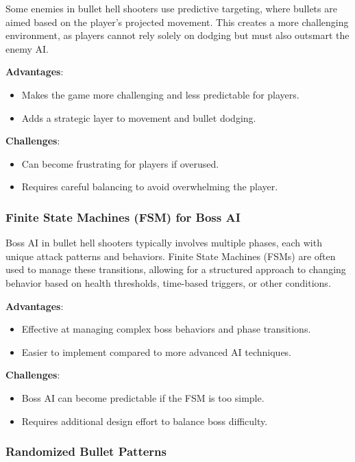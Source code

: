 Some enemies in bullet hell shooters use predictive targeting, where bullets are aimed based on the player's projected movement. This creates a more challenging environment, as players cannot rely solely on dodging but must also outsmart the enemy AI.

\textbf{Advantages}:
\begin{itemize}
    \item Makes the game more challenging and less predictable for players.
    \item Adds a strategic layer to movement and bullet dodging.
\end{itemize}

\textbf{Challenges}:
\begin{itemize}
    \item Can become frustrating for players if overused.
    \item Requires careful balancing to avoid overwhelming the player.
\end{itemize}

\subsubsection{Finite State Machines (FSM) for Boss AI}

Boss AI in bullet hell shooters typically involves multiple phases, each with unique attack patterns and behaviors. Finite State Machines (FSMs) are often used to manage these transitions, allowing for a structured approach to changing behavior based on health thresholds, time-based triggers, or other conditions.

\textbf{Advantages}:
\begin{itemize}
    \item Effective at managing complex boss behaviors and phase transitions.
    \item Easier to implement compared to more advanced AI techniques.
\end{itemize}

\textbf{Challenges}:
\begin{itemize}
    \item Boss AI can become predictable if the FSM is too simple.
    \item Requires additional design effort to balance boss difficulty.
\end{itemize}

\subsubsection{Randomized Bullet Patterns}


